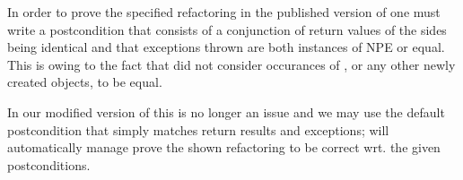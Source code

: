 In order to prove the specified  refactoring in the published version of \Refinity{} one must write a postcondition that consists of a conjunction of return values of the sides being identical and
that exceptions thrown are both instances of NPE or equal.
This is owing to the fact that \Refinity{} did not consider occurances of , or any other newly created objects, to be equal.

In our modified version of \Refinity{} this is no longer an issue and we may use the default postcondition that simply matches return results and exceptions;
\Refinity{} will automatically manage prove the shown  refactoring to be correct wrt. the given postconditions.


